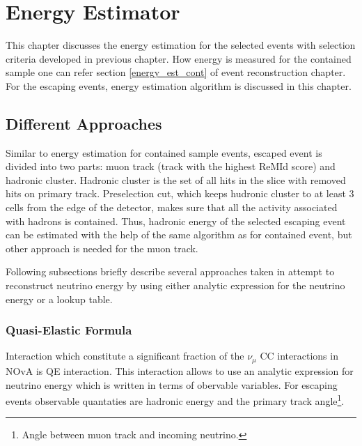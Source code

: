 \chapter{Energy Estimator}
\label{energy_estimator_chapter}

This chapter discusses the energy estimation for the selected events with selection
criteria developed in previous chapter. How energy is measured for the contained 
sample one can refer section \ref{energy_est_cont} of event reconstruction chapter.
For the escaping events, energy estimation algorithm is discussed in this chapter.

\section{Different Approaches}
Similar to energy estimation for contained sample events, escaped event is divided
into two parts: muon track (track with the highest ReMId score) and hadronic cluster.
Hadronic cluster is the set of all hits in the slice with removed hits on primary 
track. Preselection cut, which keeps hudronic cluster to at least 3 cells from
the edge of the detector, makes sure that all the activity associated with hadrons is
contained. Thus, hadronic energy of the selected escaping event can be estimated
with the help of the same algorithm as for contained event, but other approach is needed
for the muon track.

Following subsections briefly describe several approaches taken in attempt to reconstruct
neutrino energy by using either analytic expression for the neutrino energy or a 
lookup table.

\subsection{Quasi-Elastic Formula}
Interaction which constitute a significant fraction of the $\nu_\mu$ CC interactions 
in NOvA is QE interaction. This interaction allows to use an analytic expression for
neutrino energy which is written in terms of obervable variables. For escaping events
observable quantaties are hadronic energy and the primary track angle\footnote{Angle
between muon track and incoming neutrino.}. 

